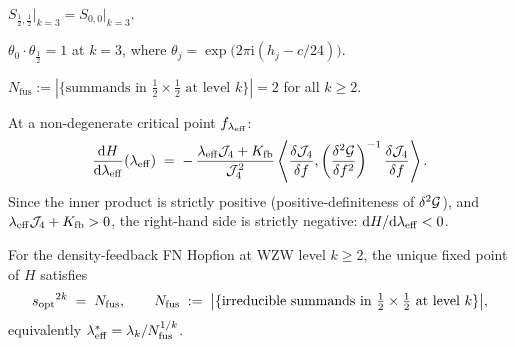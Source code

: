 \begin{proposition}
\label{P2:prop:Sselfdual}
$S_{\frac{1}{2},\frac{1}{2}}\big|_{k=3} = S_{0,0}\big|_{k=3}$.
\end{proposition}

\begin{proposition}
\label{P2:prop:twist}
$\theta_0\cdot\theta_{\frac{1}{2}} = 1$ at $k=3$,
where $\theta_j = \exp\bigl(2\pi\mathrm{i}(h_j - c/24)\bigr)$.
\end{proposition}

\begin{proposition}
\label{P2:prop:Nfus}
$N_{\mathrm{fus}} := |\{\text{summands in }\tfrac{1}{2}{\times}\tfrac{1}{2}
  \text{ at level }k\}| = 2$ for all $k\geq 2$.
\end{proposition}

\begin{proposition}
\label{P2:prop:sign}
At a non-degenerate critical point $f_{\lambda_{\mathrm{eff}}}$:
\begin{equation}
  \frac{\mathrm{d}H}{\mathrm{d}\lambda_{\mathrm{eff}}}(\lambda_{\mathrm{eff}})
  \;=\;
  -\,\frac{\lambda_{\mathrm{eff}}\mathcal{J}_4 + K_{\mathrm{fb}}}{\mathcal{J}_4^2}
  \left\langle \frac{\delta\mathcal{J}_4}{\delta f},
  \left(\frac{\delta^2\mathcal{G}}{\delta f^2}\right)^{-1}
  \frac{\delta\mathcal{J}_4}{\delta f}\right\rangle.
  \label{P2:eq:sign}
\end{equation}
Since the inner product is strictly positive (positive-definiteness
of $\delta^2\mathcal{G}$), and $\lambda_{\mathrm{eff}}\mathcal{J}_4+K_{\mathrm{fb}}>0$, the right-hand side
is strictly negative: $\mathrm{d}H/\mathrm{d}\lambda_{\mathrm{eff}} < 0$.
\end{proposition}

\begin{conjecture}
\label{P2:conj:lsl}
For the density-feedback FN Hopfion at WZW level $k\geq 2$,
the unique fixed point of $H$ satisfies
\begin{equation}
  {s_{\mathrm{opt}}}^{2k} \;=\; N_{\mathrm{fus}},
  \qquad
  N_{\mathrm{fus}}
  \;:=\;
  \bigl|\{\text{irreducible summands in }
  \tfrac{1}{2}\times\tfrac{1}{2}\text{ at level }k\}\bigr|,
  \label{P2:eq:lsl_conj}
\end{equation}
equivalently $\lambda_{\mathrm{eff}}^* = \lambda_k/N_{\mathrm{fus}}^{1/k}$.
\end{conjecture}

